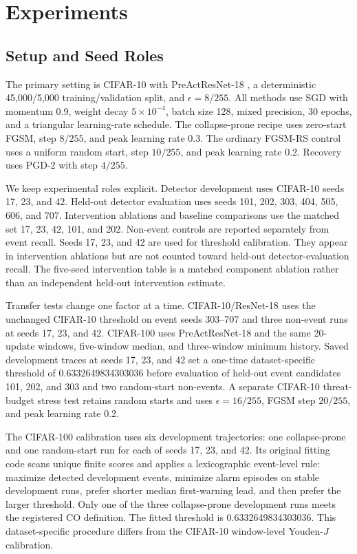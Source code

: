 \section{Experiments}
\subsection{Setup and Seed Roles}
The primary setting is CIFAR-10 with PreActResNet-18
\cite{krizhevsky2009learning,he2016identity}, a deterministic 45,000/5,000
training/validation split, and $\epsilon=8/255$. All methods use SGD with
momentum 0.9, weight decay $5\times10^{-4}$, batch size 128, mixed precision,
30 epochs, and a triangular learning-rate schedule. The collapse-prone recipe
uses zero-start FGSM, step $8/255$, and peak learning rate 0.3. The ordinary
FGSM-RS control uses a uniform random start, step $10/255$, and peak learning
rate 0.2. Recovery uses PGD-2 with step $4/255$.

We keep experimental roles explicit. Detector development uses CIFAR-10 seeds
17, 23, and 42. Held-out detector evaluation uses seeds 101, 202, 303, 404,
505, 606, and 707. Intervention ablations and baseline comparisons use the
matched set 17, 23, 42, 101, and 202. Non-event controls are reported
separately from event recall. Seeds 17, 23, and 42 are used for threshold
calibration. They appear in intervention ablations but are not counted toward
held-out detector-evaluation recall. The five-seed intervention table is a
matched component ablation rather than an independent held-out intervention
estimate.

Transfer tests change one factor at a time. CIFAR-10/ResNet-18 uses the
unchanged CIFAR-10 threshold on event seeds 303--707 and three non-event runs
at seeds 17, 23, and 42. CIFAR-100 uses PreActResNet-18 and the same 20-update
windows, five-window median, and three-window minimum history. Saved
development traces at seeds 17, 23, and 42 set a one-time dataset-specific
threshold of 0.6332649834303036 before evaluation of held-out event candidates
101, 202, and 303 and two random-start non-events. A separate CIFAR-10
threat-budget stress test retains random starts and uses $\epsilon=16/255$,
FGSM step $20/255$, and peak learning rate 0.2.

The CIFAR-100 calibration uses six development trajectories: one
collapse-prone and one random-start run for each of seeds 17, 23, and 42. Its
original fitting code scans unique finite scores and applies a lexicographic
event-level rule: maximize detected development events, minimize alarm episodes
on stable development runs, prefer shorter median first-warning lead, and then
prefer the larger threshold. Only one of the three collapse-prone development
runs meets the registered CO definition. The fitted threshold is
0.6332649834303036. This dataset-specific procedure differs from the CIFAR-10
window-level Youden-$J$ calibration.

